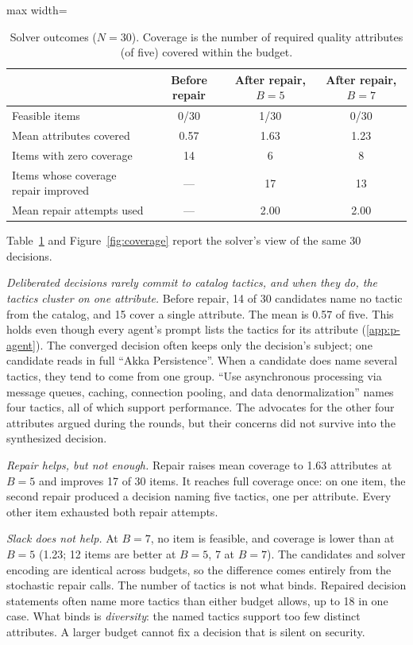 \documentclass[preprint,12pt,authoryear]{elsarticle}
\renewcommand{\_}{\textunderscore\allowbreak{}}
\begin{document}
\begin{table}[!htbp]
\caption{Solver outcomes ($N=30$). Coverage is the number of required quality attributes (of five) covered within the budget.\label{tab:rq2}}
\centering
\begin{adjustbox}{max width=\textwidth}
\begin{tabular}{@{}lccc@{}}
\toprule
 & Before repair & After repair, $B=5$ & After repair, $B=7$ \\
\midrule
Feasible items & 0/30 & 1/30 & 0/30 \\
Mean attributes covered & 0.57 & 1.63 & 1.23 \\
Items with zero coverage & 14 & 6 & 8 \\
Items whose coverage repair improved & --- & 17 & 13 \\
Mean repair attempts used & --- & 2.00 & 2.00 \\
\bottomrule
\end{tabular}
\end{adjustbox}
\end{table}
\FloatBarrier

Table~\ref{tab:rq2} and Figure~\ref{fig:coverage} report the solver's view of the same 30 decisions.

\emph{Deliberated decisions rarely commit to catalog tactics, and when they do, the tactics cluster on one attribute.} Before repair, 14 of 30 candidates name no tactic from the catalog, and 15 cover a single attribute. The mean is 0.57 of five. This holds even though every agent's prompt lists the tactics for its attribute (\ref{app:p-agent}). The converged decision often keeps only the decision's subject; one candidate reads in full ``Akka Persistence''. When a candidate does name several tactics, they tend to come from one group. ``Use asynchronous processing via message queues, caching, connection pooling, and data denormalization'' names four tactics, all of which support performance. The advocates for the other four attributes argued during the rounds, but their concerns did not survive into the synthesized decision.

\emph{Repair helps, but not enough.} Repair raises mean coverage to 1.63 attributes at $B=5$ and improves 17 of 30 items. It reaches full coverage once: on one item, the second repair produced a decision naming five tactics, one per attribute. Every other item exhausted both repair attempts.

\emph{Slack does not help.} At $B=7$, no item is feasible, and coverage is lower than at $B=5$ (1.23; 12 items are better at $B=5$, 7 at $B=7$). The candidates and solver encoding are identical across budgets, so the difference comes entirely from the stochastic repair calls. The number of tactics is not what binds. Repaired decision statements often name more tactics than either budget allows, up to 18 in one case. What binds is \emph{diversity}: the named tactics support too few distinct attributes. A larger budget cannot fix a decision that is silent on security.
\end{document}
